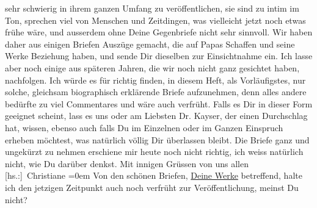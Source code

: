 \begin{ledgroupsized}[t]{13cm}
                    sehr schwierig in ihrem ganzen Umfang zu veröffentlichen, sie sind zu intim im
                    Ton, sprechen viel von Menschen und Zeitdingen, was vielleicht jetzt noch etwas
                    frühe wäre, und ausserdem ohne Deine Gegenbriefe nicht sehr sinnvoll.\pend
           \pstart
           Wir haben daher aus einigen Briefen Auszüge gemacht, die auf Papas Schaffen und seine Werke Beziehung
                    haben, und sende Dir dieselben zur Einsichtnahme ein. Ich lasse aber noch einige
                    aus späteren Jahren, die wir noch nicht ganz gesichtet haben, nachfolgen. Ich
                    würde es für richtig finden, in diesem Heft, als Vorläufigstes, nur solche,
                    gleichsam biographisch erklärende Briefe aufzunehmen, denn alles andere bedürfte
                    zu viel Commentares und wäre auch verfrüht.\pend
           \pstart
           Falls es Dir in dieser Form geeignet scheint, lass es uns oder am Liebsten Dr.
                        Kayser, der einen Durchschlag hat,
                    wissen, ebenso auch falls Du im Einzelnen oder im Ganzen Einspruch erheben
                    möchtest, was natürlich völlig Dir überlassen bleibt. Die Briefe ganz und
                    ungekürzt zu nehmen erschiene mir heute noch nicht richtig, ich weiss natürlich
                    nicht, wie Du darüber denkst.\pend
           \pstart
           Mit innigen Grüssen von uns allen{\\[\baselineskip]}\spacefill\mbox{{[}hs.:{]} Christiane}\pend
           \leftskip=0em{}\pstart
           \noindent{}{\pb}Von den schönen Briefen, \uline{Deine Werke} betreffend, halte ich den
                        jetzigen Zeitpunkt auch noch verfrüht zur Veröffentlichung, meinst Du
                        nicht?\pend
                     \endnumbering{}\end{ledgroupsized}  \newcommand{\dateiname}{L02522}\newcommand{\titel}{Christiane von Hofmannsthal an Arthur Schnitzler, 3. 9. 1929}\newcommand{\editorInnen}{Martin Anton Müller und Gerd-Hermann Susen}
      